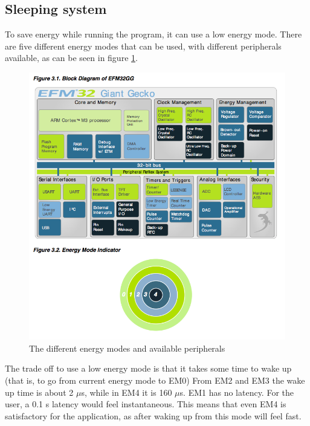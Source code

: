 

\subsection{Sleeping system}
\label{subsection:low-energy}

To save energy while running the program, it can use a low energy mode.
There are five different energy modes that can be used, with different peripherals available, as can be seen in figure \ref{fig:energy_modes}.\cite{referencemanual}

\begin{figure}[H]
\centering
\includegraphics[scale=0.5]{figures/energymodes.png}
\caption{The different energy modes and available peripherals}
\label{fig:energy_modes}
\end{figure}

The trade off to use a low energy mode is that it takes some time to wake up (that is, to go from current energy mode to EM0)
From EM2 and EM3  the wake up time is about 2 $\mu$s, while in EM4 it is 160 $\mu$s. EM1 has no latency.
For the user, a 0.1 s latency would feel instantaneous.\cite{response}
This means that even EM4 is satisfactory for the application, as after waking up from this mode will feel fast.

